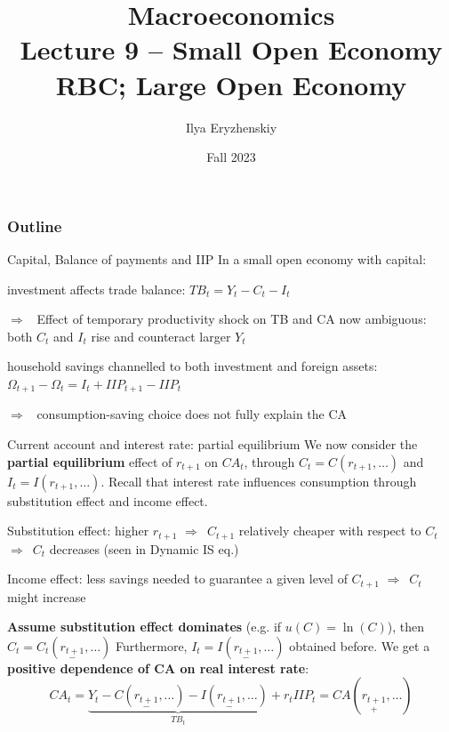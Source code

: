 \documentclass{beamer}
\title[PSME]{Macroeconomics\\ Lecture 9 -- Small Open Economy RBC; Large Open Economy}
\author[I. Eryzhenskiy]{Ilya Eryzhenskiy}
\institute[Paris-1]{PSME Panth\'{e}on-Sorbonne Master in Economics}
\date[PSME macro]{Fall 2023}
\newenvironment{mytemize}
{\vfill\itemize[nolistsep,itemsep=\fill,label=\color{blue}{$\triangleright$}]}
  {\enditemize}
\newenvironment{mynumerate}
{\vfill\enumerate[nolistsep,itemsep=\fill,label=\arabic*.]}
  {\endenumerate}
\newcommand{\rarr}{$\Rightarrow$\ }
\begin{document}
\begin{frame}
\maketitle
\end{frame}
\begin{frame}
\frametitle{Outline}
\tableofcontents
\end{frame}

\begin{frame}{Capital, Balance of payments and IIP}
  In a small open economy with capital:  
  \begin{mynumerate}
  \item investment affects trade balance: $TB_t = Y_t - C_t - I_t$
	\begin{mytemize}
	  \item[\rarr] Effect of temporary productivity shock on TB and CA now ambiguous: both $C_t$ and $I_t$ rise and counteract larger $Y_t$
	\end{mytemize}
  \item household savings channelled to both investment and foreign assets: $\Omega_{t+1} - \Omega_t = I_t + IIP_{t+1} - IIP_t$
	\begin{mytemize}
	  \item[\rarr] consumption-saving choice does not fully explain the CA
	\end{mytemize}
  \end{mynumerate}
\end{frame}

\begin{frame}{Current account and interest rate: partial equilibrium}
  We now consider the \textbf{partial equilibrium} effect of $r_{t+1}$ on $CA_t$, through $C_t = C(r_{t+1}, \dots)$ and $I_t = I(r_{t+1}, \dots)$.
  \vfill
  Recall that interest rate influences consumption through substitution effect and income effect.
  \begin{mynumerate}
  \item Substitution effect: higher $r_{t+1}$ \rarr $C_{t+1}$ relatively cheaper with respect to $C_t$ \rarr $C_t$ decreases (seen in Dynamic IS eq.)
  \item Income effect: less savings needed to guarantee a given level of $C_{t+1}$ \rarr $C_t$ might increase
  \end{mynumerate}

  \textbf{Assume substitution effect dominates} (e.g. if $u(C) = \ln(C)$), then $C_t = C_t(\underset{-}{r_{t+1}}, \dots)$
  \vfill 
  Furthermore, $I_t = I(\underset{-}{r_{t+1}}, \dots)$ obtained before. We get a \textbf{positive dependence of CA on real interest rate}:
  $$CA_t = \underbrace{Y_t - C(\underset{-}{r_{t+1}},\dots) - I(\underset{-}{r_{t+1}}, \dots)}_{TB_t} +  r_t IIP_t = CA(\underset{+}{r_{t+1}},\dots)$$
\end{frame}
\end{document}
